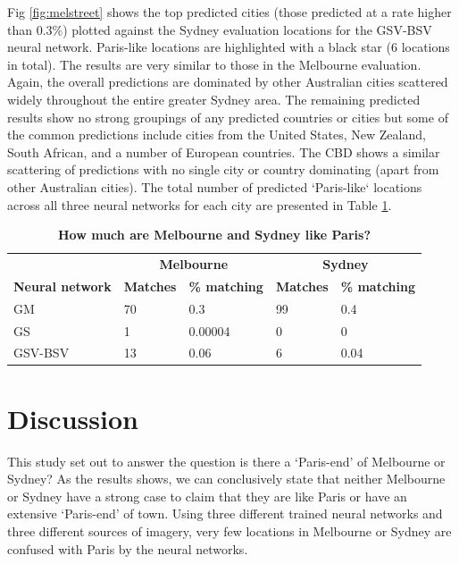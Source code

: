 \documentclass[10pt,letterpaper]{article}
\begin{document}
Fig \ref{fig:melstreet} shows the top predicted cities (those predicted at a rate higher than 0.3\%) plotted against the Sydney evaluation locations for the GSV-BSV neural network. Paris-like locations are highlighted with a black star (6 locations in total). The results are very similar to those in the Melbourne evaluation. Again, the overall predictions are dominated by other Australian cities scattered widely throughout the entire greater Sydney area. The remaining predicted results show no strong groupings of any predicted countries or cities but some of the common predictions include cities from the United States, New Zealand, South African, and a number of European countries. The CBD shows a similar scattering of predictions with no single city or country dominating (apart from other Australian cities). The total number of predicted `Paris-like` locations across all three neural networks for each city are presented in Table \ref{tab:melbournesydneyparis}.

\begin{table}[!htbp]
\caption{\bf How much are Melbourne and Sydney like Paris? \label{tab:melbournesydneyparis}}     
\begin{tabular}{ l  l l l  l}
 \hline    &  \multicolumn{2}{c}{\textbf{Melbourne}} & \multicolumn{2}{c}{\textbf{Sydney}}  \\  
\textbf{Neural network} & \textbf{Matches} & \textbf{\% matching}  & \textbf{Matches} & \textbf{\% matching}\\ \hline
GM & 70 & 0.3 & 99 & 0.4 \\ 
GS & 1 & 0.00004 & 0 & 0 \\ 
GSV-BSV & 13 & 0.06 & 6 & 0.04 \\ \hline
\end{tabular}
\end{table}


\section*{Discussion}\label{sec:discussion}
This study set out to answer the question is there a `Paris-end' of Melbourne or Sydney? As the results shows, we can conclusively state that neither Melbourne or Sydney have a strong case to claim that they are like Paris or have an extensive `Paris-end' of town. Using three different trained neural networks and three different sources of imagery, very few locations in Melbourne or Sydney are confused with Paris by the neural networks. 
\end{document}
